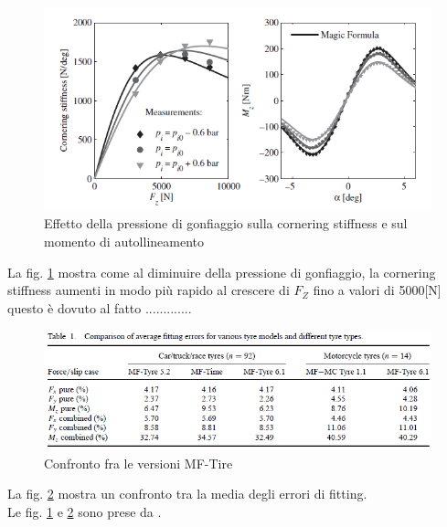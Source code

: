 \begin{figure}[ht]
    \centering
    \includegraphics[scale=0.7]{Immagini/Tyres/Tyre pressure effects for a passenger car tyre.png}
    \caption{Effetto della pressione di gonfiaggio sulla cornering stiffness e sul momento di autollineamento}
    \label{fig:Pressure effects}
\end{figure}
La fig. \ref{fig:Pressure effects} mostra come al diminuire della pressione di gonfiaggio, la cornering stiffness aumenti in modo più rapido al crescere di $F_Z$ fino a valori di 5000[N] questo è dovuto al fatto .............\\
\begin{figure}[!h]
    \centering
    \includegraphics[scale=0.7]{Immagini/Tyres/comparison MF-Tire version.png}
    \caption{Confronto fra le versioni MF-Tire}
    \label{fig:Comparison MF-Tire version}
\end{figure}
La fig. \ref{fig:Comparison MF-Tire version} mostra un confronto tra la media degli errori di fitting.\\  
Le fig. \ref{fig:Pressure effects} e \ref{fig:Comparison MF-Tire version} sono prese da \cite{Besselink2010AnIM}.\\

